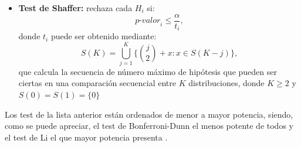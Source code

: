 \begin{itemize}
\item \textbf{Test de Shaffer:} rechaza cada $H_i$ si:
\[ \textit{p-valor}_{i} \leq \frac{\alpha}{t_i}, \]
donde $t_i$ puede ser obtenido mediante:
\[ S(K) = \bigcup_{j=1}^{K} \{{j \choose 2}  + x: x \in S(K-j)\}, \]
que calcula la secuencia de número máximo de hipótesis que pueden ser ciertas en una comparación secuencial
entre $K$ distribuciones, donde $K \geq 2$ y $S(0) = S(1) = \{0\}$
\end{itemize}

Los test de la lista anterior están ordenados de menor a mayor potencia, siendo, como se puede apreciar,
el test de Bonferroni-Dunn el menos potente de todos y el test de Li el que mayor potencia presenta \cite{potencia}.


